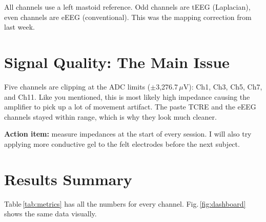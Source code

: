\documentclass[10pt,conference]{IEEEtran}
\begin{document}
All channels use a left mastoid reference.
Odd channels are tEEG (Laplacian), even channels are eEEG (conventional).
This was the mapping correction from last week.

\section{Signal Quality: The Main Issue}

Five channels are clipping at the ADC limits ($\pm$3,276.7\,$\mu$V):
Ch1, Ch3, Ch5, Ch7, and Ch11.
Like you mentioned, this is most likely high impedance causing the amplifier
to pick up a lot of movement artifact.
The paste TCRE and the eEEG channels stayed within range, which is
why they look much cleaner.

\textbf{Action item:} measure impedances at the start of every session.
I will also try applying more conductive gel to the felt electrodes before
the next subject.

\section{Results Summary}

Table\,\ref{tab:metrics} has all the numbers for every channel.
Fig.\,\ref{fig:dashboard} shows the same data visually.
\end{document}
